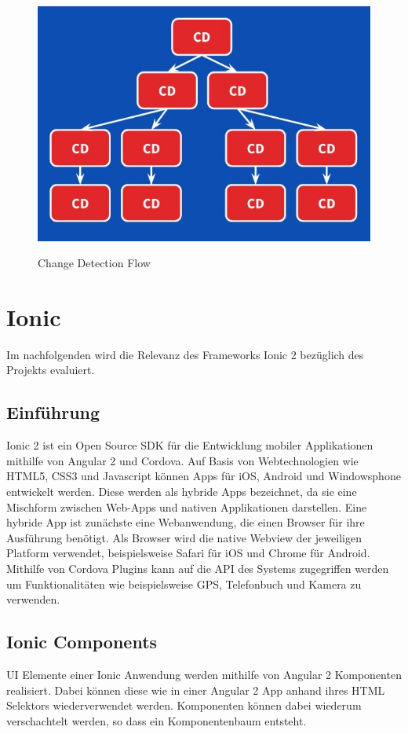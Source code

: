 \begin{figure}[ht]
 \centering
 \includegraphics[width=0.7\linewidth]{kapitel3/cd-tree.jpg}
 \caption{Change Detection Flow}\cite{changedetection-explained}
\end{figure}

\newpage
\section{Ionic}

Im nachfolgenden wird die Relevanz des Frameworks Ionic 2 bezüglich des Projekts \projectname{} evaluiert.

\subsection{Einführung}

Ionic 2 ist ein Open Source \ac{SDK} für die Entwicklung mobiler Applikationen mithilfe von Angular 2 und Cordova.
Auf Basis von Webtechnologien wie HTML5, CSS3 und Javascript können Apps für iOS, Android und Windowsphone
entwickelt werden. Diese werden als hybride Apps bezeichnet,
da sie eine Mischform zwischen Web-Apps und nativen Applikationen darstellen.
Eine hybride App ist zunächste eine Webanwendung, die einen Browser für ihre Ausführung benötigt.
Als Browser wird die native Webview der jeweiligen Platform verwendet,
beispielsweise Safari für iOS und Chrome für Android.
Mithilfe von Cordova Plugins kann auf die \ac{API} des Systems zugegriffen werden um Funktionalitäten wie beispielsweise GPS, Telefonbuch und Kamera zu verwenden.
\cite{ionic34:online}

\subsection{Ionic Components}

\ac{UI} Elemente einer Ionic Anwendung werden mithilfe von Angular 2 Komponenten realisiert.
Dabei können diese wie in einer Angular 2 App anhand ihres HTML Selektors wiederverwendet werden.
Komponenten können dabei wiederum verschachtelt werden, so dass ein Komponentenbaum entsteht.

